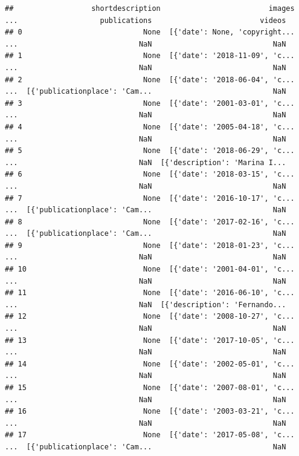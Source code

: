 \documentclass[
]{book}
\begin{document}
\begin{alert}
\begin{verbatim}
##                  shortdescription                         images  ...                   publications                         videos
## 0                            None  [{'date': None, 'copyright...  ...                            NaN                            NaN
## 1                            None  [{'date': '2018-11-09', 'c...  ...                            NaN                            NaN
## 2                            None  [{'date': '2018-06-04', 'c...  ...  [{'publicationplace': 'Cam...                            NaN
## 3                            None  [{'date': '2001-03-01', 'c...  ...                            NaN                            NaN
## 4                            None  [{'date': '2005-04-18', 'c...  ...                            NaN                            NaN
## 5                            None  [{'date': '2018-06-29', 'c...  ...                            NaN  [{'description': 'Marina I...
## 6                            None  [{'date': '2018-03-15', 'c...  ...                            NaN                            NaN
## 7                            None  [{'date': '2016-10-17', 'c...  ...  [{'publicationplace': 'Cam...                            NaN
## 8                            None  [{'date': '2017-02-16', 'c...  ...  [{'publicationplace': 'Cam...                            NaN
## 9                            None  [{'date': '2018-01-23', 'c...  ...                            NaN                            NaN
## 10                           None  [{'date': '2001-04-01', 'c...  ...                            NaN                            NaN
## 11                           None  [{'date': '2016-06-10', 'c...  ...                            NaN  [{'description': 'Fernando...
## 12                           None  [{'date': '2008-10-27', 'c...  ...                            NaN                            NaN
## 13                           None  [{'date': '2017-10-05', 'c...  ...                            NaN                            NaN
## 14                           None  [{'date': '2002-05-01', 'c...  ...                            NaN                            NaN
## 15                           None  [{'date': '2007-08-01', 'c...  ...                            NaN                            NaN
## 16                           None  [{'date': '2003-03-21', 'c...  ...                            NaN                            NaN
## 17                           None  [{'date': '2017-05-08', 'c...  ...  [{'publicationplace': 'Cam...                            NaN

\end{verbatim}
\end{alert}
\end{document}
